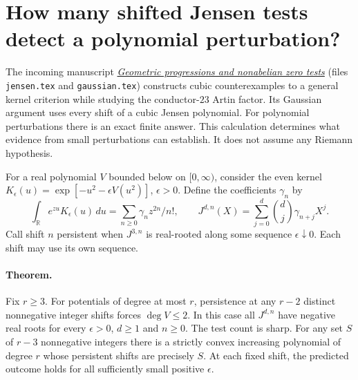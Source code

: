 \section{How many shifted Jensen tests detect a polynomial perturbation?}
\label{sec:finite-jensen}
The incoming manuscript \href{https://github.com/VladimirReshetnikov/ProveIt/blob/5cc267af75a635199ac5d93a7d49cbce521daefc/docs/incoming/grh_transfers_density_gaps_and_zero_tests.zip}{\emph{Geometric progressions and nonabelian zero tests}} (files \texttt{jensen.tex} and \texttt{gaussian.tex})
constructs cubic counterexamples to a general kernel criterion while studying
the conductor-$23$ Artin factor. Its Gaussian argument uses every shift of a
cubic Jensen polynomial. For polynomial perturbations there is an exact finite
answer. This calculation determines what evidence from small perturbations
can establish. It does not assume any Riemann hypothesis.

For a real polynomial $V$ bounded below on $[0,\infty)$, consider the even kernel
$K_\epsilon(u)=\exp[-u^2-\epsilon V(u^2)]$, $\epsilon>0$.
Define the coefficients $\gamma_n$ by
\[
 \int_{\mathbb R} e^{zu}K_\epsilon(u)\,du
 =\sum_{n\ge0}\gamma_n z^{2n}/n!,\qquad
 J^{d,n}(X)=\sum_{j=0}^d \binom{d}{j}\gamma_{n+j}X^j .
\]
Call shift $n$ persistent when $J^{3,n}$ is real-rooted along some sequence
$\epsilon\downarrow0$. Each shift may use its own sequence.

\paragraph{Theorem.}
Fix $r\ge3$. For potentials of degree at most $r$, persistence at any
$r-2$ distinct nonnegative integer shifts forces $\deg V\le2$.
In this case all $J^{d,n}$ have negative real roots for every $\epsilon>0$,
$d\ge1$ and $n\ge0$. The test count is sharp. For any set $S$ of $r-3$
nonnegative integers there is a strictly convex increasing polynomial of degree
$r$ whose persistent shifts are precisely $S$. At each fixed shift, the predicted
outcome holds for all sufficiently small positive $\epsilon$.

